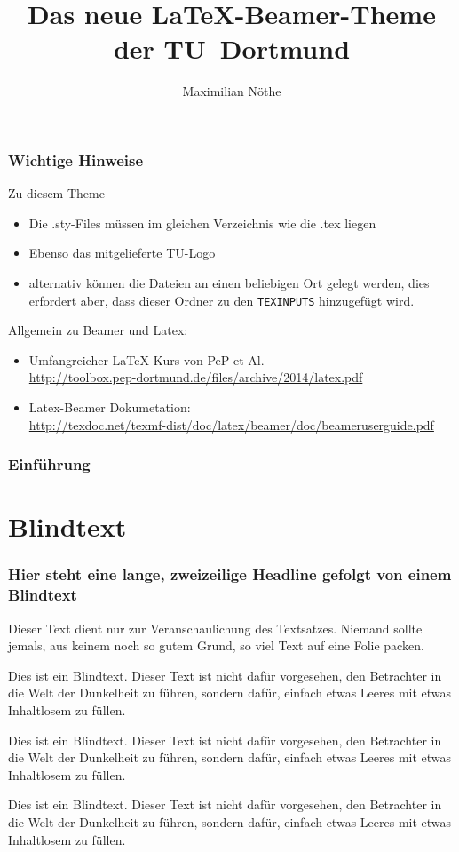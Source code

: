 \documentclass[9pt]{beamer}
\title{Das neue \LaTeX-Beamer-Theme der TU~Dortmund}
\author{Maximilian Nöthe}
\institute[test]{Names des Lehrstuhls \\[\baselineskip] Name der Fakultät}
\begin{document}
\begin{frame}
  \setcounter{framenumber}{0}
  \titlepage
\end{frame}

\begin{frame}
  \frametitle{Wichtige Hinweise}
  Zu diesem Theme
  \begin{itemize}
    \item Die .sty-Files müssen im gleichen Verzeichnis wie die .tex liegen
    \item Ebenso das mitgelieferte TU-Logo
    \item alternativ können die Dateien an einen beliebigen Ort gelegt werden,
    dies erfordert aber, dass dieser Ordner zu den \texttt{TEXINPUTS} hinzugefügt wird.
  \end{itemize}
  Allgemein zu Beamer und Latex:
  \begin{itemize}
    \item Umfangreicher \LaTeX-Kurs von PeP et Al. \\
    \url{http://toolbox.pep-dortmund.de/files/archive/2014/latex.pdf}
    \item Latex-Beamer Dokumetation:\\
    \url{http://texdoc.net/texmf-dist/doc/latex/beamer/doc/beameruserguide.pdf}
  \end{itemize}
\end{frame}

\begin{frame}
    \frametitle{Einführung}
    \tableofcontents[pausesections]
\end{frame}

\section{Blindtext}
\begin{frame}
	\frametitle{Hier steht eine lange, zweizeilige Headline
		\newline gefolgt von einem Blindtext}
Dieser Text dient nur zur Veranschaulichung des Textsatzes. Niemand sollte jemals, aus keinem noch so gutem Grund, so viel Text auf eine Folie packen.

Dies ist ein Blindtext. Dieser Text ist nicht dafür vorgesehen, den Betrachter in die Welt der Dunkelheit zu führen, sondern dafür, einfach etwas Leeres mit etwas Inhaltlosem zu füllen.

Dies ist ein Blindtext. Dieser Text ist nicht dafür vorgesehen, den Betrachter in die Welt der Dunkelheit zu führen, sondern dafür, einfach etwas Leeres mit etwas Inhaltlosem zu füllen.

Dies ist ein Blindtext. Dieser Text ist nicht dafür vorgesehen, den Betrachter in die Welt der Dunkelheit zu führen, sondern dafür, einfach etwas Leeres mit etwas Inhaltlosem zu füllen.

\end{frame}
\end{document}
